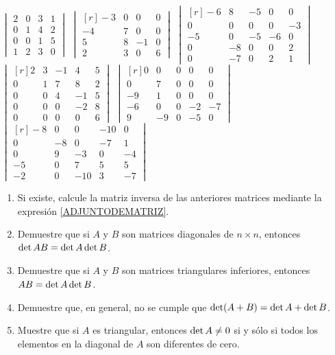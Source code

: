 \begin{tasks}[
    style=enumerate,
    label-offset = 3mm,
    ]
    \task $\begin{vmatrix*}2 & 0 & 3 & 1 \\ 0 & 1 & 4 & 2 \\ 0 & 0 & 1 & 5 \\ 1 & 2 & 3 & 0\end{vmatrix*}$
    \task $\begin{vmatrix*}[r]-3 & 0 & 0 & 0 \\ -4 & 7 & 0 & 0 \\ 5 & 8 & -1 & 0 \\ 2 & 3 & 0 & 6\end{vmatrix*}$
    \task $\begin{vmatrix*}[r]-6 & 8 & -5 & 0 & 0 \\ 0 & 0 & 0 & 0 & -3 \\ -5 & 0 & -5 & -6 & 0 \\ 0 & -8 & 0 & 0 & 2 \\ 0 & -7 & 0 & 2 & 1\end{vmatrix*}$
    \task $\begin{vmatrix*}[r]2 & 3 & -1 & 4 & 5 \\ 0 & 1 & 7 & 8 & 2 \\ 0 & 0 & 4 & -1 & 5 \\ 0 & 0 & 0 & -2 & 8 \\ 0 & 0 & 0 & 0 & 6\end{vmatrix*}$
    \task $\begin{vmatrix*}[r]0 & 0 & 0 & 0 & 0 \\ 0 & 7 & 0 & 0 & 0 \\ -9 & 1 & 0 & 0 & 0 \\ -6 & 0 & 0 & -2 & -7 \\ 9 & -9 & 0 & -5 & 0\end{vmatrix*}$
    \task $\begin{vmatrix*}[r]-8 & 0 & 0 & -10 & 0 \\ 0 & -8 & 0 & -7 & 1 \\ 0 & 9 & -3 & 0 & -4 \\ -5 & 0 & 7 & 5 & 5 \\ -2 & 0 & -10 & 3 & -7\end{vmatrix*}$
\end{tasks}
\begin{enumerate}[start=17]
    \item Si existe, calcule la matriz inversa de las anteriores matrices mediante la expresión \ref{ADJUNTODEMATRIZ}.
    \item Demuestre que si $A$ y $B$ son matrices diagonales de $n \times n$, entonces $\operatorname{det} A B=\operatorname{det} A \operatorname{det} B$.
    \item Demuestre que si $A$ y $B$ son matrices triangulares inferiores, entonces $A B=\operatorname{det} A \operatorname{det} B$.
    \item Demuestre que, en general, no se cumple que $\operatorname{det}(A+B)=\operatorname{det} A+\operatorname{det} B$.
    \item Muestre que si $A$ es triangular, entonces $\operatorname{det} A \neq 0$ si y sólo si todos los elementos en la diagonal de $A$ son diferentes de cero.
\end{enumerate}

